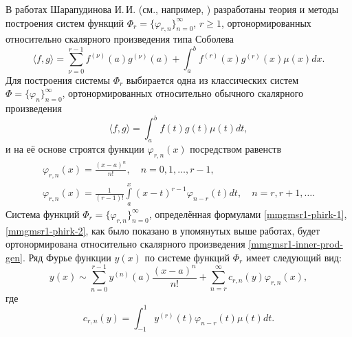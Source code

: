 В работах Шарапудинова И.\,И. (см., например, \cite{mmgmsr1-Sha18, mmgmsr1-Shii-Shti-izvvuzov2017, mmgmsr1-Shii-matzam2017, mmgmsr1-ShaGadGad16, mmgmsr1-ShaGad16, mmgmsr1-Shii-lag-demi2015, mmgmsr1-SHII-MMG-Demi2015}) разработаны теория и методы построения систем функций $\Phi_r=\{\varphi_{r,n}\}_{n=0}^\infty$, $r \ge 1$, ортонормированных относительно скалярного произведения типа Соболева
\begin{equation}\label{mmgmsr1-inner-prod-gen}
\langle f,g \rangle =
\sum_{\nu=0}^{r-1}f^{(\nu)}(a)g^{(\nu)}(a)+\int_{a}^{b}f^{(r)}(x)g^{(r)}(x)\mu(x)dx.
\end{equation}
Для построения системы $\Phi_r$ выбирается одна из классических систем $\Phi =\{\varphi_n\}_{n=0}^\infty$, ортонормированных относительно обычного скалярного произведения
\begin{equation}\label{mmgmsr1-classic-mul}
\langle f,g \rangle =\int_{a}^{b}f(t)g(t)\mu(t)dt,
\end{equation}
и на её основе строятся функции $\varphi_{r,n}(x)$ посредством равенств
\begin{gather}
\label{mmgmsr1-phirk-1}
\varphi_{r,n}(x) =\frac{(x-a)^n}{n!}, \quad n=0,1,\ldots, r-1,\\
\label{mmgmsr1-phirk-2}
\varphi_{r,n}(x) =\frac{1}{(r-1)!}\int\limits_{a}^x(x-t)^{r-1}\varphi_{n-r}(t)dt, \quad n=r,r+1,\ldots.
\end{gather}
Система функций $\Phi_r=\{\varphi_{r,n}\}_{n=0}^\infty$, определённая формулами \eqref{mmgmsr1-phirk-1}, \eqref{mmgmsr1-phirk-2}, как было показано в упомянутых выше работах, будет ортонормирована относительно скалярного произведения \eqref{mmgmsr1-inner-prod-gen}.
Ряд Фурье функции $y(x)$ по системе функций $\Phi_r$ имеет следующий вид:
\begin{equation}\label{mmgmsr1-fourier-series}
y(x) \sim \sum_{n=0}^{r-1} y^{(n)}(a)\frac{(x-a)^n}{n!}+ \sum_{n=r}^\infty c_{r,n}(y) \varphi_{r,n}(x),
\end{equation}
где
\begin{equation}\label{mmgmsr1-crk}
c_{r,n}(y)=\int_{-1}^1 y^{(r)}(t)\varphi_{n-r}(t)\mu(t)dt.
\end{equation}


